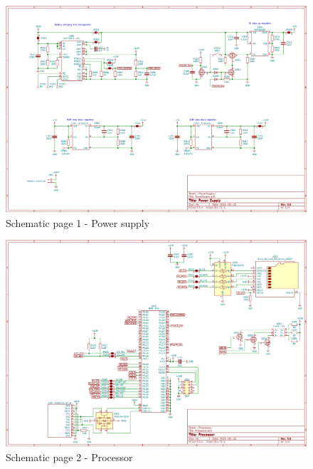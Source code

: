 \begin{landscape}

\begin{figure}[!htb]
\centering
\includegraphics[width=\paperwidth,keepaspectratio]{images/Schematic_REV3_Power.png}
\caption{Schematic page 1 - Power supply}
\label{fig:schematic_power}
\end{figure}

\begin{figure}[!htb]
\centering
\includegraphics[width=\paperwidth,keepaspectratio]{images/Schematic_REV3_Processor.png}
\caption{Schematic page 2 - Processor}
\label{fig:schematic_processor}
\end{figure}


\end{landscape}
